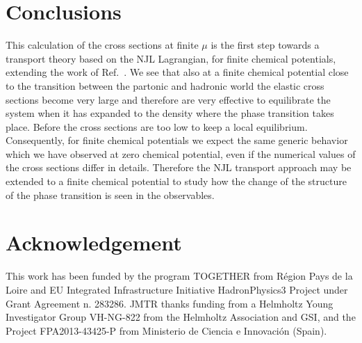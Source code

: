 \documentclass[a4paper]{jpconf}
\begin{document}
\section{Conclusions}
This calculation of the cross sections at finite $\mu$ is the first step towards a transport theory based on the NJL Lagrangian, for finite chemical potentials, extending the work of Ref.~\cite{Marty1,Marty2}. We see that also at a finite chemical potential close to the transition between the  partonic and hadronic world the elastic cross sections become very large and therefore are very effective to equilibrate the system when it has expanded to the density where the phase transition takes place. Before the cross sections are too low to keep a local equilibrium. Consequently, for finite chemical potentials we expect the same generic behavior which we have observed at zero chemical potential, even if the numerical values of the cross sections differ in details. Therefore the NJL transport approach may be extended to a finite chemical potential to study how the change of the structure of the phase transition is seen in the observables.  
\section*{Acknowledgement}
This work has been funded by the program TOGETHER from R\'egion Pays de la Loire and EU Integrated Infrastructure Initiative HadronPhysics3 Project under Grant Agreement
n. 283286. JMTR thanks funding from a Helmholtz Young Investigator Group VH-NG-822 from the Helmholtz Association and GSI, and the Project FPA2013-43425-P from
Ministerio de Ciencia e Innovaci\'on (Spain).
\end{document}
